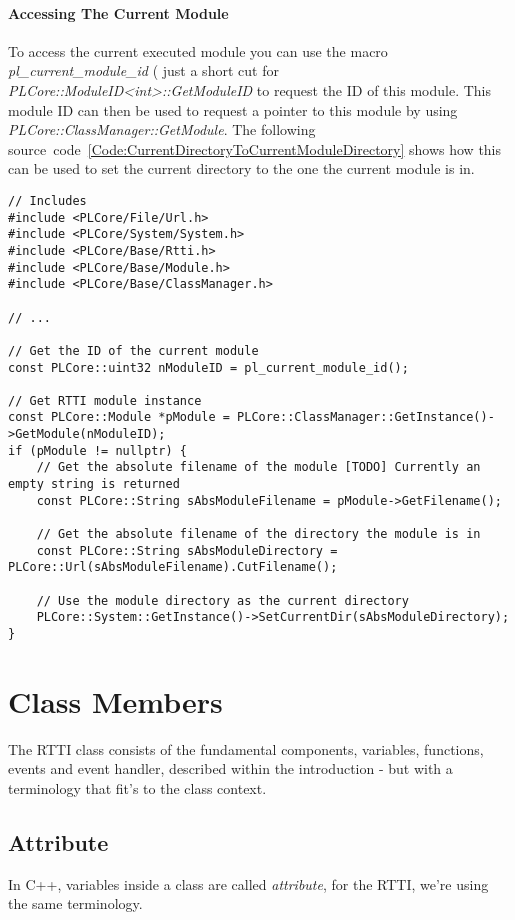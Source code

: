 \paragraph{Accessing The Current Module}
To access the current executed module you can use the macro \emph{pl\_current\_module\_id} ( just a short cut for \emph{PLCore::ModuleID<int>::GetModuleID} to request the ID of this module. This module ID can then be used to request a pointer to this module by using \emph{PLCore::ClassManager::GetModule}. The following source~code~\ref{Code:CurrentDirectoryToCurrentModuleDirectory} shows how this can be used to set the current directory to the one the current module is in.
\begin{lstlisting}[label=Code:CurrentDirectoryToCurrentModuleDirectory,caption={Setting the current directory to the one the current module is in}]
// Includes
#include <PLCore/File/Url.h>
#include <PLCore/System/System.h>
#include <PLCore/Base/Rtti.h>
#include <PLCore/Base/Module.h>
#include <PLCore/Base/ClassManager.h>

// ...

// Get the ID of the current module
const PLCore::uint32 nModuleID = pl_current_module_id();

// Get RTTI module instance
const PLCore::Module *pModule = PLCore::ClassManager::GetInstance()->GetModule(nModuleID);
if (pModule != nullptr) {
	// Get the absolute filename of the module [TODO] Currently an empty string is returned
	const PLCore::String sAbsModuleFilename = pModule->GetFilename();

	// Get the absolute filename of the directory the module is in
	const PLCore::String sAbsModuleDirectory = PLCore::Url(sAbsModuleFilename).CutFilename();

	// Use the module directory as the current directory
	PLCore::System::GetInstance()->SetCurrentDir(sAbsModuleDirectory);
}
\end{lstlisting}




\section{Class Members}
The RTTI class consists of the fundamental components, variables, functions, events and event handler, described within the introduction - but with a terminology that fit's to the class context.



\subsection{Attribute}
In C++, variables inside a class are called \emph{attribute}, for the RTTI, we're using the same terminology.



